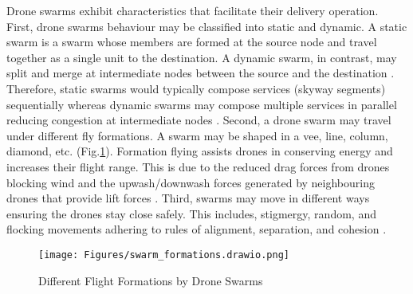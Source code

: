 \documentclass[conference]{IEEEtran}
\begin{document}
Drone swarms exhibit characteristics that facilitate their delivery operation. First, drone swarms behaviour may be classified into static and dynamic. A static swarm is a swarm whose members are formed at the source node and travel together as a single unit to the destination. A dynamic swarm, in contrast, may split and merge at intermediate nodes between the source and the destination \cite{akram2017security}. Therefore, static swarms would typically compose services (skyway segments) sequentially whereas dynamic swarms may compose multiple services in parallel reducing congestion at intermediate nodes \cite{alkouz2020swarm}. Second, a drone swarm may travel under different fly formations. A swarm may be shaped in a vee, line, column, diamond, etc. (Fig.\ref{formations}). Formation flying assists drones in conserving energy and increases their flight range. This is due to the reduced drag forces from drones blocking wind and the upwash/downwash forces generated by neighbouring drones that provide lift forces \cite{alkouz2020formation}. Third, swarms may move in different ways ensuring the drones stay close safely. This includes, stigmergy, random, and flocking movements adhering to rules of alignment, separation, and cohesion \cite{avvenuti2018detection}.

\begin{figure} [htp!]
    \centering
    \texttt{[image: Figures/swarm\_formations.drawio.png]}
    \caption{Different Flight Formations by Drone Swarms}
    \label{formations}
\end{figure}




\end{document}
